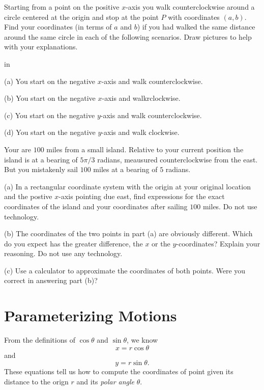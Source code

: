 \documentclass{ximera}
\newcommand{\pskip}{\vskip 0.1 in}
\begin{document}
\begin{question}  \label{tagtec4t5r:Cosine}
Starting from a point on the positive $x$-axis you walk counterclockwise around a circle centered at the origin and stop at the point $P$ with coordinates $(a,b)$. Find your coordinates (in terms of $a$ and $b$) if you had walked the same distance around the same circle in each of the following scenarios. Draw pictures to help with your explanations.

\pskip

(a) You start on the negative $x$-axis and walk counterclockwise.

(b) You start on the negative $x$-axis and walkrclockwise.

(c) You start on the negative $y$-axis and walk counterclockwise.

(d) You start on the negative $y$-axis and walk clockwise.

\end{question}


\begin{question}  \label{tdsfdsfkt5r:Cosine}
Your are $100$ miles from a small island. Relative to your current position the island is at a bearing of $5\pi/3$ radians, meausured counterclockwise from the east. But you mistakenly sail $100$ miles at a bearing of $5$ radians.

(a) In a rectangular coordinate system with the origin at your original location and the postive $x$-axis pointing due east, find expressions for the exact coordinates of the island and your coordinates after sailing $100$ miles. Do not use technology.

(b) The coordinates of the two points in part (a) are obviously different. Which do you expect has the greater difference, the $x$ or the $y$-coordinates? Explain your reasoning. Do not use any technology.

(c) Use a calculator to approximate the coordinates of both points. Were you correct in answering part (b)?


\end{question}



\section{Parameterizing Motions}
From the definitions of $\cos\theta$ and $\sin \theta$, we know
\[
    x = r \cos \theta 
\]
and
\[
      y=r\sin \theta .
\]
These equations tell us how to compute the coordinates of point given its distance to the orign $r$ and its \emph{polar angle} $\theta$.
\end{document}
